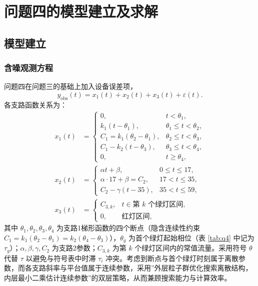 \documentclass[UTF8,a4paper,fontset=none]{ctexart}
\numberwithin{equation}{section}
\begin{document}
\section{问题四的模型建立及求解}
\subsection{模型建立}
\subsubsection{含噪观测方程}
问题四在问题三的基础上加入设备误差项，
\begin{equation}
y_{\mathrm{obs}}(t)=x_1(t)+x_2(t)+x_3(t)+\varepsilon(t).
\end{equation}
各支路函数关系为：
\begin{align}
  x_1(t) &= \begin{cases}
    0, & t<\theta_1,\\
    k_1(t-\theta_1), & \theta_1\le t<\theta_2,\\
    C_1=k_1(\theta_2-\theta_1), & \theta_2\le t<\theta_3,\\
    C_1-k_2(t-\theta_3), & \theta_3\le t<\theta_4,\\
    0, & t\ge\theta_4,
  \end{cases} \label{eq:q4_q1} \\
  x_2(t) &= \begin{cases}
    \alpha t+\beta, & 0\le t\le 17,\\
    \alpha\cdot17+\beta=C_2, & 17<t\le 35,\\
    C_2-\gamma(t-35), & 35<t\le59,
  \end{cases} \label{eq:q4_q2} \\
  x_3(t) &= \begin{cases}
    C_{3,k}, & t\in\text{第 }k\text{ 个绿灯区间},\\
    0, & \text{红灯区间},
  \end{cases} \label{eq:q4_q3}
\end{align}
其中 $\theta_1,\theta_2,\theta_3,\theta_4$ 为支路1梯形函数的四个断点（隐含连续性约束 $C_1=k_1(\theta_2-\theta_1)=k_2(\theta_4-\theta_3)$），$\theta_g$ 为首个绿灯起始相位（表 \ref{tab:q4} 中记为 $\tau_g$）；$\alpha,\beta,\gamma,C_2$ 为支路2参数；$C_{3,k}$ 为第 $k$ 个绿灯区间内的常值流量。采用符号 $\theta$ 代替 $\tau$ 以避免与符号表中时滞 $\tau_i$ 冲突。考虑到断点与首个绿灯时刻属于离散参数，而各支路斜率与平台值属于连续参数，采用''外层粒子群优化搜索离散结构，内层最小二乘估计连续参数''的双层策略，从而兼顾搜索能力与计算效率。
\end{document}
